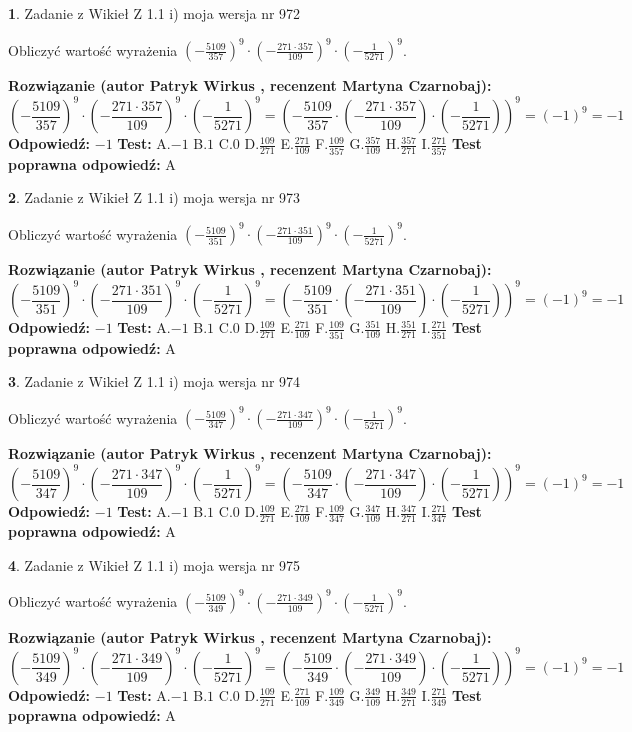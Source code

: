 \documentclass[12pt, a4paper]{article}
\theoremstyle{definition} %
\newtheorem{zad}{}
\newcommand{\zadStart}[1]{\begin{zad}#1\newline}
\newcommand{\zadStop}{\end{zad}}
\newcommand{\rozwStart}[2]{\noindent \textbf{Rozwiązanie (autor #1 , recenzent #2): }\newline}
\newcommand{\rozwStop}{\newline}
\newcommand{\odpStart}{\noindent \textbf{Odpowiedź:}\newline}
\newcommand{\odpStop}{\newline}
\newcommand{\testStart}{\noindent \textbf{Test:}\newline}
\newcommand{\testStop}{\newline}
\newcommand{\kluczStart}{\noindent \textbf{Test poprawna odpowiedź:}\newline}
\newcommand{\kluczStop}{\newline}
\begin{document}
\zadStart{Zadanie z Wikieł Z 1.1 i) moja wersja nr 972}

Obliczyć wartość wyrażenia $(-\frac{5109}{357})^{9} \cdot (-\frac{271 \cdot 357}{109})^{9} \cdot (-\frac{1}{5271})^{9}$.
\zadStop
\rozwStart{Patryk Wirkus}{Martyna Czarnobaj}
$$(-\frac{5109}{357})^{9} \cdot (-\frac{271 \cdot 357}{109})^{9} \cdot (-\frac{1}{5271})^{9} = (-\frac{5109}{357} \cdot (-\frac{271 \cdot 357}{109}) \cdot (-\frac{1}{5271}))^{9} = (-1)^{9} = -1$$
\rozwStop
\odpStart
$-1$
\odpStop
\testStart
A.$-1$ B.$1$ C.$0$ D.$\frac{109}{271}$ E.$\frac{271}{109}$
F.$\frac{109}{357}$ G.$\frac{357}{109}$
H.$\frac{357}{271}$
I.$\frac{271}{357}$
\testStop
\kluczStart
A
\kluczStop



\zadStart{Zadanie z Wikieł Z 1.1 i) moja wersja nr 973}

Obliczyć wartość wyrażenia $(-\frac{5109}{351})^{9} \cdot (-\frac{271 \cdot 351}{109})^{9} \cdot (-\frac{1}{5271})^{9}$.
\zadStop
\rozwStart{Patryk Wirkus}{Martyna Czarnobaj}
$$(-\frac{5109}{351})^{9} \cdot (-\frac{271 \cdot 351}{109})^{9} \cdot (-\frac{1}{5271})^{9} = (-\frac{5109}{351} \cdot (-\frac{271 \cdot 351}{109}) \cdot (-\frac{1}{5271}))^{9} = (-1)^{9} = -1$$
\rozwStop
\odpStart
$-1$
\odpStop
\testStart
A.$-1$ B.$1$ C.$0$ D.$\frac{109}{271}$ E.$\frac{271}{109}$
F.$\frac{109}{351}$ G.$\frac{351}{109}$
H.$\frac{351}{271}$
I.$\frac{271}{351}$
\testStop
\kluczStart
A
\kluczStop



\zadStart{Zadanie z Wikieł Z 1.1 i) moja wersja nr 974}

Obliczyć wartość wyrażenia $(-\frac{5109}{347})^{9} \cdot (-\frac{271 \cdot 347}{109})^{9} \cdot (-\frac{1}{5271})^{9}$.
\zadStop
\rozwStart{Patryk Wirkus}{Martyna Czarnobaj}
$$(-\frac{5109}{347})^{9} \cdot (-\frac{271 \cdot 347}{109})^{9} \cdot (-\frac{1}{5271})^{9} = (-\frac{5109}{347} \cdot (-\frac{271 \cdot 347}{109}) \cdot (-\frac{1}{5271}))^{9} = (-1)^{9} = -1$$
\rozwStop
\odpStart
$-1$
\odpStop
\testStart
A.$-1$ B.$1$ C.$0$ D.$\frac{109}{271}$ E.$\frac{271}{109}$
F.$\frac{109}{347}$ G.$\frac{347}{109}$
H.$\frac{347}{271}$
I.$\frac{271}{347}$
\testStop
\kluczStart
A
\kluczStop



\zadStart{Zadanie z Wikieł Z 1.1 i) moja wersja nr 975}

Obliczyć wartość wyrażenia $(-\frac{5109}{349})^{9} \cdot (-\frac{271 \cdot 349}{109})^{9} \cdot (-\frac{1}{5271})^{9}$.
\zadStop
\rozwStart{Patryk Wirkus}{Martyna Czarnobaj}
$$(-\frac{5109}{349})^{9} \cdot (-\frac{271 \cdot 349}{109})^{9} \cdot (-\frac{1}{5271})^{9} = (-\frac{5109}{349} \cdot (-\frac{271 \cdot 349}{109}) \cdot (-\frac{1}{5271}))^{9} = (-1)^{9} = -1$$
\rozwStop
\odpStart
$-1$
\odpStop
\testStart
A.$-1$ B.$1$ C.$0$ D.$\frac{109}{271}$ E.$\frac{271}{109}$
F.$\frac{109}{349}$ G.$\frac{349}{109}$
H.$\frac{349}{271}$
I.$\frac{271}{349}$
\testStop
\kluczStart
A
\kluczStop
\end{document}
